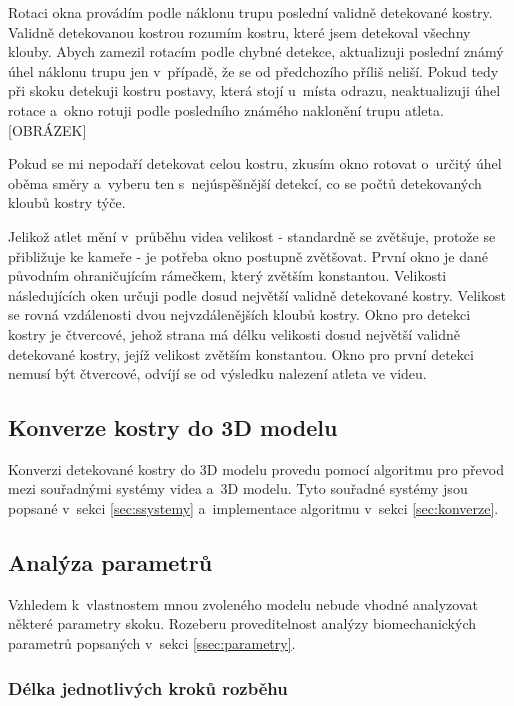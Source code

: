 Rotaci okna provádím podle náklonu trupu poslední validně detekované kostry. Validně detekovanou kostrou rozumím kostru, které jsem detekoval všechny klouby. Abych zamezil rotacím podle chybné detekce, aktualizuji poslední známý úhel náklonu trupu jen v~případě, že se od předchozího příliš neliší. Pokud tedy při skoku detekuji kostru postavy, která stojí u~místa odrazu, neaktualizuji úhel rotace a~okno rotuji podle posledního známého naklonění trupu atleta. [OBRÁZEK]

Pokud se mi nepodaří detekovat celou kostru, zkusím okno rotovat o~určitý úhel oběma směry a~vyberu ten s~nejúspěšnější detekcí, co se počtů detekovaných kloubů kostry týče.

Jelikož atlet mění v~průběhu videa velikost - standardně se zvětšuje, protože se přibližuje ke kameře - je potřeba okno postupně zvětšovat. První okno je dané původním ohraničujícím rámečkem, který zvětším konstantou. Velikosti následujících oken určuji podle dosud největší validně detekované kostry. Velikost se rovná vzdálenosti dvou nejvzdálenějších kloubů kostry. Okno pro detekci kostry je čtvercové, jehož strana má délku velikosti dosud největší validně detekované kostry, jejíž velikost zvětším konstantou. Okno pro první detekci nemusí být čtvercové, odvíjí se od výsledku nalezení atleta ve videu.



\subsection{Konverze kostry do 3D modelu}

Konverzi detekované kostry do 3D modelu provedu pomocí algoritmu pro převod mezi souřadnými systémy videa a~3D modelu. Tyto souřadné systémy jsou popsané v~sekci \ref{sec:ssystemy} a~implementace algoritmu v~sekci \ref{sec:konverze}.



\subsection{Analýza parametrů}

Vzhledem k~vlastnostem mnou zvoleného modelu nebude vhodné analyzovat některé parametry skoku. Rozeberu proveditelnost analýzy biomechanických parametrů popsaných v~sekci \ref{ssec:parametry}.


\subsubsection{Délka jednotlivých kroků rozběhu}

